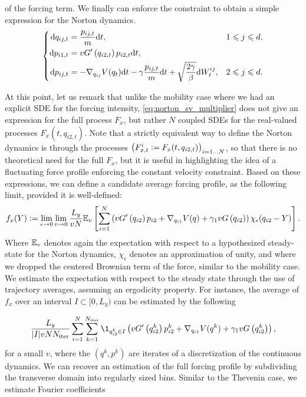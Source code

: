 of the forcing term. We finally can enforce the constraint to obtain a simple expression for the Norton dynamics.
\begin{equation}
    \label{eq:norton_sv_dynamics}
    \left\{\begin{aligned}
        \mathrm{d} q_{ij,t}&=\frac{p_{ij,t}}m\mathrm{d} t,&1\leqslant j\leqslant d,\\
        \mathrm{d} p_{i1,t}&=vG'\left(q_{i2,t}\right)p_{i2,t}\mathrm{d} t,&\\
        \mathrm{d} p_{ij,t}&=-\nabla_{q_{ij}}V(q_t)\mathrm{d} t-\gamma \frac{p_{ij,t}}m\mathrm{d} t+\sqrt{\frac{2\gamma}\beta}\mathrm{d} W_t^{ij},&2\leqslant j\leqslant d.
    \end{aligned}\right.
\end{equation}

At this point, let us remark that unlike the mobility case where we had an explicit SDE for the forcing intensity, \eqref{eq:norton_sv_multiplier} does not give an expression for the full process $F_x$, but rather $N$ coupled SDEs for the real-valued processes $F_x(t,q_{i2,t})$.
Note that a strictly equivalent way to define the Norton dynamics is through the processes $\left(F_{x,t}^i \mathrel{\mathop:}= F_x(t,q_{i2,t})\right)_{i=1\dots N}$, so that there is no theoretical need for the full $F_x$, but it is useful in highlighting the idea of a fluctuating force profile enforcing the constant velocity constraint.
Based on these expressions, we can define a candidate average forcing profile, as the following limit, provided it is well-defined:
\begin{equation}
    \label{eq:fx_definition}
    f_x(Y)\mathrel{\mathop:}= \underset{\epsilon \to 0}{\lim} \, \underset{v \to 0}{\lim}\, \frac{L_y}{vN}\mathbb{E}_v\left[\sum_{i=1}^N \left(vG'\left(q_{i2}\right)p_{i2}+\nabla_{q_{i1}}V(q)+\gamma_1vG\left(q_{i2}\right)\right)\chi_\epsilon(q_{i2}-Y)\right].
\end{equation}
Where $\mathbb{E}_v$ denotes again the expectation with respect to a hypothesized steady-state for the Norton dynamics,  $\chi_\epsilon$ denotes an approximation of unity, and where we dropped the centered Brownian term of the force, similar to the mobility case.
We estimate the expectation with respect to the steady state through the use of trajectory averages, assuming an ergodicity property. For instance, the average of $f_x$ over an interval $I \subset [0,L_y)$ can be estimated by the following

\begin{equation}
    \label{eq:norton_forcing_estimator}
    \frac{L_y}{|I|vN N_{\mathrm{iter}}}\sum_{i=1}^N\sum_{k=1}^{N_{\mathrm{iter}}}\1_{q_{i2}^k \in I}\left(vG'\left(q_{i2}^k\right)p_{i2}^k+\nabla_{q_{i1}}V(q^k)+\gamma_1vG\left(q_{i2}^k\right)\right),
\end{equation}
for a small $v$, where the $(q^k,p^k)$ are iterates of a discretization of the continuous dynamics.
We can recover an estimation of the full forcing profile by subdividing the transverse domain into regularly sized bins. Similar to the Thevenin case, we estimate Fourier coefficients 

